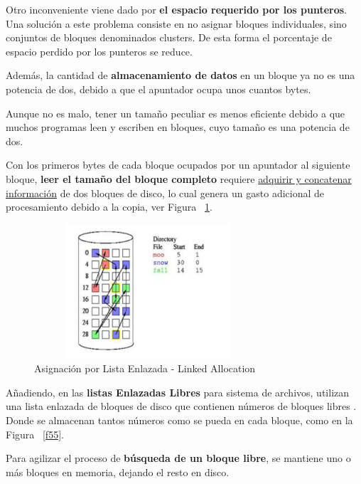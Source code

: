 \documentclass[10pt,journal]{IEEEtran}
\begin{document}
\begin{enumerate}
    Otro inconveniente viene dado por \textbf{el espacio requerido por los punteros}. Una solución a este problema consiste en no asignar bloques individuales, sino conjuntos de bloques denominados clusters. De esta forma el porcentaje de espacio perdido por los punteros se reduce. 
    
    Además, la cantidad de \textbf{almacenamiento de datos} en un bloque ya no es una potencia de dos, debido a que el apuntador ocupa unos cuantos bytes.
    
    Aunque no es malo, tener un tamaño peculiar es menos eficiente debido a que muchos programas leen y escriben en bloques, cuyo tamaño es una potencia de dos.
    
    Con los primeros bytes de cada bloque ocupados por un apuntador al siguiente bloque, \textbf{leer el tamaño del bloque completo} requiere \underline{adquirir y concatenar información} de dos bloques de disco, lo cual genera un gasto adicional de procesamiento debido a la copia, ver Figura ~\ref{f44}.
    
    \begin{figure}[H]
        \begin{center}
        \includegraphics[width=8.4cm, height=5cm]{Imagenes/Archivo2.JPG}
        \caption{Asignación por Lista Enlazada - Linked Allocation}
        \label{f44} 
        \end{center}
    \end{figure}
    
    Añadiendo, en las \textbf{listas Enlazadas Libres} para sistema de archivos, utilizan una lista enlazada de bloques de disco que contienen números de bloques libres \cite{yarleque2018estructura}. Donde se almacenan tantos números como se pueda en cada bloque, como en la Figura ~\ref{f55}.
    
    Para agilizar el proceso de \textbf{búsqueda de un bloque libre}, se mantiene uno o más bloques en memoria, dejando el resto en disco.
    

\end{enumerate}
\end{document}

